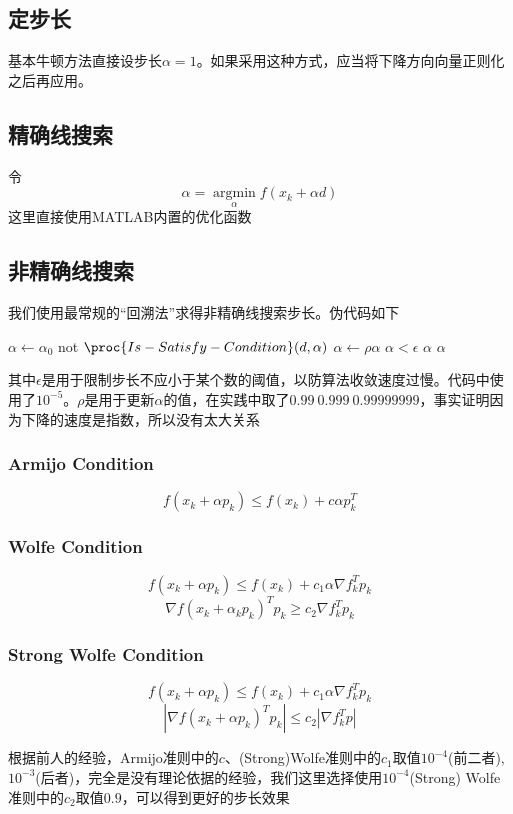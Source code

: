 \documentclass[11pt, a4paper]{article}
\begin{document}
\subsection{定步长}
基本牛顿方法直接设步长$\alpha=1$。如果采用这种方式，应当将下降方向向量正则化之后再应用。

\subsection{精确线搜索}
令\[\alpha=\mathop{\arg \min}\limits_\alpha f(x_k+\alpha d)\]
这里直接使用MATLAB内置的优化函数

\subsection{非精确线搜索}

我们使用最常规的“回溯法”求得非精确线搜索步长。伪代码如下
\begin{codebox}
\li $\alpha\gets\alpha_0$
\li \While not $\proc{Is-Satisfy-Condition}(d,\alpha)$
	\Do
\li		$\alpha\gets\rho\alpha$
\li		\If $\alpha<\epsilon$
\li			\Then  \Return $\alpha$		
		\End
	\End
\li \Return $\alpha$
\end{codebox}

其中$\epsilon$是用于限制步长不应小于某个数的阈值，以防算法收敛速度过慢。代码中使用了$10^{-5}$。$\rho$是用于更新$\alpha$的值，在实践中取了$0.99~0.999~0.99999999$，事实证明因为下降的速度是指数，所以没有太大关系


\subsubsection{Armijo Condition}
\[f(x_k+\alpha p_k)\le f(x_k)+c\alpha p_k^T\]

\subsubsection{Wolfe Condition}
\[f(x_k+\alpha p_k)\le f(x_k)+c_1\alpha\nabla f_k^Tp_k\]
\[\nabla f(x_k+\alpha_kp_k)^Tp_k \ge c_2\nabla f_k^Tp_k\]

\subsubsection{Strong Wolfe Condition}
\[f(x_k+\alpha p_k)\le f(x_k)+c_1\alpha\nabla f_k^Tp_k\]
\[|\nabla f(x_k+\alpha p_k)^Tp_k| \le c_2|\nabla f_k^Tp|\]

根据前人的经验\cite{ding2005investigation}\cite{Nocedal2006NO}\cite{gilbert1989some}，Armijo准则中的$c$、(Strong)Wolfe准则中的$c_1$取值$10^{-4}$(前二者),$10^{-3}$(后者)，完全是没有理论依据的经验，我们这里选择使用$10^{-4}$(Strong) Wolfe准则中的$c_2$取值$0.9$，可以得到更好的步长效果
\end{document}
